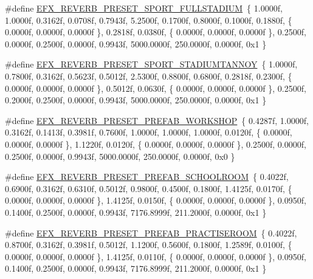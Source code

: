 \begin{DoxyCompactItemize}
\item 
\#define \mbox{\hyperlink{efx-presets_8h_af8fa941595873499927d9a0c8870a20e}{E\+F\+X\+\_\+\+R\+E\+V\+E\+R\+B\+\_\+\+P\+R\+E\+S\+E\+T\+\_\+\+S\+P\+O\+R\+T\+\_\+\+F\+U\+L\+L\+S\+T\+A\+D\+I\+UM}}~\{ 1.\+0000f, 1.\+0000f, 0.\+3162f, 0.\+0708f, 0.\+7943f, 5.\+2500f, 0.\+1700f, 0.\+8000f, 0.\+1000f, 0.\+1880f, \{ 0.\+0000f, 0.\+0000f, 0.\+0000f \}, 0.\+2818f, 0.\+0380f, \{ 0.\+0000f, 0.\+0000f, 0.\+0000f \}, 0.\+2500f, 0.\+0000f, 0.\+2500f, 0.\+0000f, 0.\+9943f, 5000.\+0000f, 250.\+0000f, 0.\+0000f, 0x1 \}
\item 
\#define \mbox{\hyperlink{efx-presets_8h_afbd61a4687adf060ebc6a26aa6018671}{E\+F\+X\+\_\+\+R\+E\+V\+E\+R\+B\+\_\+\+P\+R\+E\+S\+E\+T\+\_\+\+S\+P\+O\+R\+T\+\_\+\+S\+T\+A\+D\+I\+U\+M\+T\+A\+N\+N\+OY}}~\{ 1.\+0000f, 0.\+7800f, 0.\+3162f, 0.\+5623f, 0.\+5012f, 2.\+5300f, 0.\+8800f, 0.\+6800f, 0.\+2818f, 0.\+2300f, \{ 0.\+0000f, 0.\+0000f, 0.\+0000f \}, 0.\+5012f, 0.\+0630f, \{ 0.\+0000f, 0.\+0000f, 0.\+0000f \}, 0.\+2500f, 0.\+2000f, 0.\+2500f, 0.\+0000f, 0.\+9943f, 5000.\+0000f, 250.\+0000f, 0.\+0000f, 0x1 \}
\item 
\#define \mbox{\hyperlink{efx-presets_8h_a6ad70d927e2b4e20cb27fa09c97f1757}{E\+F\+X\+\_\+\+R\+E\+V\+E\+R\+B\+\_\+\+P\+R\+E\+S\+E\+T\+\_\+\+P\+R\+E\+F\+A\+B\+\_\+\+W\+O\+R\+K\+S\+H\+OP}}~\{ 0.\+4287f, 1.\+0000f, 0.\+3162f, 0.\+1413f, 0.\+3981f, 0.\+7600f, 1.\+0000f, 1.\+0000f, 1.\+0000f, 0.\+0120f, \{ 0.\+0000f, 0.\+0000f, 0.\+0000f \}, 1.\+1220f, 0.\+0120f, \{ 0.\+0000f, 0.\+0000f, 0.\+0000f \}, 0.\+2500f, 0.\+0000f, 0.\+2500f, 0.\+0000f, 0.\+9943f, 5000.\+0000f, 250.\+0000f, 0.\+0000f, 0x0 \}
\item 
\#define \mbox{\hyperlink{efx-presets_8h_aec9b167a892e651662053f1a0c2ace4e}{E\+F\+X\+\_\+\+R\+E\+V\+E\+R\+B\+\_\+\+P\+R\+E\+S\+E\+T\+\_\+\+P\+R\+E\+F\+A\+B\+\_\+\+S\+C\+H\+O\+O\+L\+R\+O\+OM}}~\{ 0.\+4022f, 0.\+6900f, 0.\+3162f, 0.\+6310f, 0.\+5012f, 0.\+9800f, 0.\+4500f, 0.\+1800f, 1.\+4125f, 0.\+0170f, \{ 0.\+0000f, 0.\+0000f, 0.\+0000f \}, 1.\+4125f, 0.\+0150f, \{ 0.\+0000f, 0.\+0000f, 0.\+0000f \}, 0.\+0950f, 0.\+1400f, 0.\+2500f, 0.\+0000f, 0.\+9943f, 7176.\+8999f, 211.\+2000f, 0.\+0000f, 0x1 \}
\item 
\#define \mbox{\hyperlink{efx-presets_8h_ac5e6666e90ef33af0813c7f2ea1985e8}{E\+F\+X\+\_\+\+R\+E\+V\+E\+R\+B\+\_\+\+P\+R\+E\+S\+E\+T\+\_\+\+P\+R\+E\+F\+A\+B\+\_\+\+P\+R\+A\+C\+T\+I\+S\+E\+R\+O\+OM}}~\{ 0.\+4022f, 0.\+8700f, 0.\+3162f, 0.\+3981f, 0.\+5012f, 1.\+1200f, 0.\+5600f, 0.\+1800f, 1.\+2589f, 0.\+0100f, \{ 0.\+0000f, 0.\+0000f, 0.\+0000f \}, 1.\+4125f, 0.\+0110f, \{ 0.\+0000f, 0.\+0000f, 0.\+0000f \}, 0.\+0950f, 0.\+1400f, 0.\+2500f, 0.\+0000f, 0.\+9943f, 7176.\+8999f, 211.\+2000f, 0.\+0000f, 0x1 \}

\end{DoxyCompactItemize}
